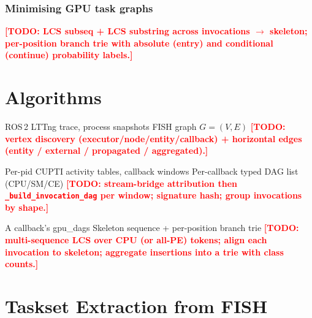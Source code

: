 \documentclass[conference]{IEEEtran}
\newcommand{\todoit}[1]{\textcolor{red}{\textbf{[TODO: #1]}}}
\begin{document}
\subsubsection{Minimising GPU task graphs}
\todoit{LCS subseq + LCS substring across invocations $\to$
skeleton; per-position branch trie with absolute (entry) and
conditional (continue) probability labels.}

\section{Algorithms}

\begin{algorithm}[ht]
\caption{FISH graph generation}
\label{alg:fish-graph}
\begin{algorithmic}[1]
\Require ROS\,2 LTTng trace, process snapshots
\Ensure FISH graph $G = (V, E)$
\todoit{vertex discovery (executor/node/entity/callback) +
horizontal edges (entity / external / propagated /
aggregated).}
\end{algorithmic}
\end{algorithm}

\begin{algorithm}[ht]
\caption{GPU-DAG generation}
\label{alg:gpu-dag}
\begin{algorithmic}[1]
\Require Per-pid CUPTI activity tables, callback windows
\Ensure Per-callback typed DAG list (CPU/SM/CE)
\todoit{stream-bridge attribution then \texttt{\_build\_invocation\_dag}
per window; signature hash; group invocations by shape.}
\end{algorithmic}
\end{algorithm}

\begin{algorithm}[ht]
\caption{GPU task minimisation (skeleton extraction)}
\label{alg:skeleton}
\begin{algorithmic}[1]
\Require A callback's gpu\_dags
\Ensure Skeleton sequence + per-position branch trie
\todoit{multi-sequence LCS over CPU (or all-PE) tokens; align each
invocation to skeleton; aggregate insertions into a trie with class
counts.}
\end{algorithmic}
\end{algorithm}

\section{Taskset Extraction from FISH}
\end{document}
